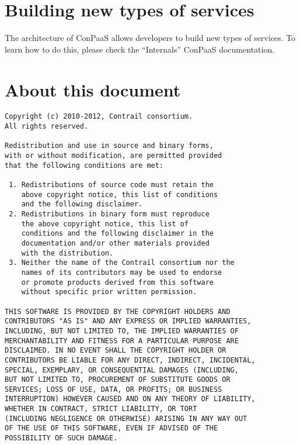 \documentclass[10pt]{article}
\begin{document}
\section{Building new types of services}

The architecture of ConPaaS allows developers to build new types of
services. To learn how to do this, please check the ``Internals''
ConPaaS documentation.

\section{About this document}

\begin{verbatim}
Copyright (c) 2010-2012, Contrail consortium.
All rights reserved.

Redistribution and use in source and binary forms, 
with or without modification, are permitted provided
that the following conditions are met:

 1. Redistributions of source code must retain the
    above copyright notice, this list of conditions
    and the following disclaimer.
 2. Redistributions in binary form must reproduce
    the above copyright notice, this list of 
    conditions and the following disclaimer in the
    documentation and/or other materials provided
    with the distribution.
 3. Neither the name of the Contrail consortium nor the
    names of its contributors may be used to endorse
    or promote products derived from this software 
    without specific prior written permission.

THIS SOFTWARE IS PROVIDED BY THE COPYRIGHT HOLDERS AND
CONTRIBUTORS "AS IS" AND ANY EXPRESS OR IMPLIED WARRANTIES,
INCLUDING, BUT NOT LIMITED TO, THE IMPLIED WARRANTIES OF
MERCHANTABILITY AND FITNESS FOR A PARTICULAR PURPOSE ARE
DISCLAIMED. IN NO EVENT SHALL THE COPYRIGHT HOLDER OR
CONTRIBUTORS BE LIABLE FOR ANY DIRECT, INDIRECT, INCIDENTAL,
SPECIAL, EXEMPLARY, OR CONSEQUENTIAL DAMAGES (INCLUDING, 
BUT NOT LIMITED TO, PROCUREMENT OF SUBSTITUTE GOODS OR 
SERVICES; LOSS OF USE, DATA, OR PROFITS; OR BUSINESS 
INTERRUPTION) HOWEVER CAUSED AND ON ANY THEORY OF LIABILITY,
WHETHER IN CONTRACT, STRICT LIABILITY, OR TORT
(INCLUDING NEGLIGENCE OR OTHERWISE) ARISING IN ANY WAY OUT
OF THE USE OF THIS SOFTWARE, EVEN IF ADVISED OF THE
POSSIBILITY OF SUCH DAMAGE.
\end{verbatim}
\end{document}
